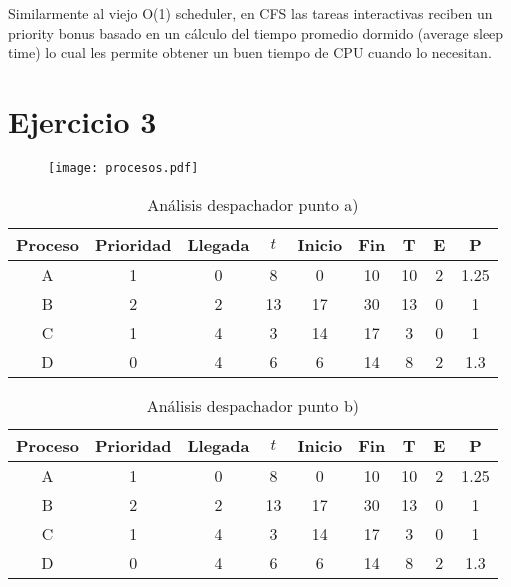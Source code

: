 \documentclass[11pt]{article}
\begin{document}
Similarmente al viejo O(1) scheduler, en CFS las tareas interactivas reciben un
priority bonus basado en un cálculo del tiempo promedio dormido (average sleep
time) lo cual les permite obtener un buen tiempo de CPU cuando lo necesitan.

\newpage
\section*{Ejercicio 3}
\begin{figure}[h!]
  \begin{center}
    \texttt{[image: procesos.pdf]}
  \end{center}
\end{figure}

\begin{table}[h!]
\begin{center}
      \begin{tabular}{|c|c|c|c|c|c|c|c|c|}
          \hline
          Proceso & Prioridad & Llegada & $t$ & Inicio & Fin & T & E & P \\
          \hline
          A & 1 & 0 & 8 & 0 & 10 & 10 & 2 & 1.25 \\
          \hline
          B & 2 & 2 & 13 & 17 & 30 & 13 & 0 & 1 \\
          \hline
          C & 1 & 4 & 3 & 14 & 17 & 3 & 0 & 1 \\
          \hline
          D & 0 & 4 & 6 & 6 & 14 & 8 & 2 & 1.3 \\
          \hline
      \end{tabular}
      \caption{Análisis despachador punto a)}
\end{center}
\end{table}

\begin{table}[h!]
\begin{center}
      \begin{tabular}{|c|c|c|c|c|c|c|c|c|}
            \hline
            Proceso & Prioridad & Llegada & $t$ & Inicio & Fin & T & E & P \\
            \hline
            A & 1 & 0 & 8 & 0 & 10 & 10 & 2 & 1.25 \\
            \hline
            B & 2 & 2 & 13 & 17 & 30 & 13 & 0 & 1 \\
            \hline
            C & 1 & 4 & 3 & 14 & 17 & 3 & 0 & 1 \\
            \hline
            D & 0 & 4 & 6 & 6 & 14 & 8 & 2 & 1.3 \\
            \hline
        \end{tabular}
      \caption{Análisis despachador punto b)}
\end{center}
\end{table}
\end{document}
